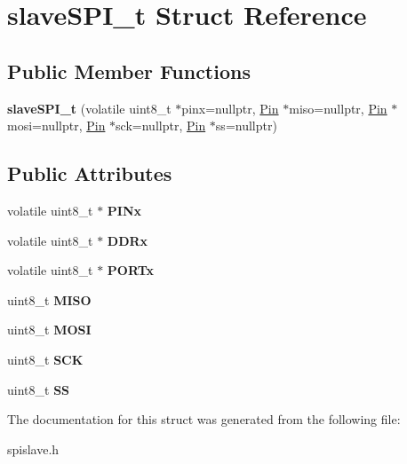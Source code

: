 \hypertarget{structslaveSPI__t}{}\section{slave\+S\+P\+I\+\_\+t Struct Reference}
\label{structslaveSPI__t}
\subsection*{Public Member Functions}
\begin{DoxyCompactItemize}
\item 
\mbox{\label{structslaveSPI__t_a1b6a92bfd0ff9f66643a2216703070fe}} 
{\bfseries slave\+S\+P\+I\+\_\+t} (volatile uint8\+\_\+t $\ast$pinx=nullptr, \hyperlink{classPin}{Pin} $\ast$miso=nullptr, \hyperlink{classPin}{Pin} $\ast$mosi=nullptr, \hyperlink{classPin}{Pin} $\ast$sck=nullptr, \hyperlink{classPin}{Pin} $\ast$ss=nullptr)
\end{DoxyCompactItemize}
\subsection*{Public Attributes}
\begin{DoxyCompactItemize}
\item 
\mbox{\label{structslaveSPI__t_a87109c268334437e6c10cde1a0ba03af}} 
volatile uint8\+\_\+t $\ast$ {\bfseries P\+I\+Nx}
\item 
\mbox{\label{structslaveSPI__t_a77665ecee539253948fc71839bc554e7}} 
volatile uint8\+\_\+t $\ast$ {\bfseries D\+D\+Rx}
\item 
\mbox{\label{structslaveSPI__t_a5588c63730f0f979979505bc9fd9c549}} 
volatile uint8\+\_\+t $\ast$ {\bfseries P\+O\+R\+Tx}
\item 
\mbox{\label{structslaveSPI__t_ad9840e1a743e4e44ceb98423dbf9e187}} 
uint8\+\_\+t {\bfseries M\+I\+SO}
\item 
\mbox{\label{structslaveSPI__t_afa1934adc11d621b99622b2c3d64f39c}} 
uint8\+\_\+t {\bfseries M\+O\+SI}
\item 
\mbox{\label{structslaveSPI__t_a9806668f14328150edfee7d9c9c50c16}} 
uint8\+\_\+t {\bfseries S\+CK}
\item 
\mbox{\label{structslaveSPI__t_a784ce6629767e64b0bbe7ffcf2937d52}} 
uint8\+\_\+t {\bfseries SS}
\end{DoxyCompactItemize}


The documentation for this struct was generated from the following file\+:\begin{DoxyCompactItemize}
\item 
spislave.\+h\end{DoxyCompactItemize}
